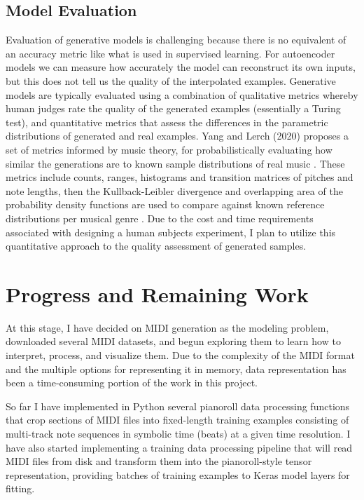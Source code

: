 \documentclass[sigconf,authorversion]{acmart}
\begin{document}
\subsection{Model Evaluation}

Evaluation of generative models is challenging because there is no
equivalent of an accuracy metric like what is used in supervised
learning. For autoencoder models we can measure how accurately the
model can reconstruct its own inputs, but this does not tell us the
quality of the interpolated examples. Generative models are typically
evaluated using a combination of qualitative metrics whereby human
judges rate the quality of the generated examples (essentially a
Turing test), and quantitative metrics that assess the differences in
the parametric distributions of generated and real examples. Yang and
Lerch (2020) proposes a set of metrics informed by music theory, for
probabilistically evaluating how similar the generations are to known
sample distributions of real music \cite{yang_evaluation_2020}. These
metrics include counts, ranges, histograms and transition matrices of
pitches and note lengths, then the Kullback-Leibler divergence and
overlapping area of the probability density functions are used to
compare against known reference distributions per musical genre
\cite{yang_evaluation_2020}. Due to the cost and time requirements
associated with designing a human subjects experiment, I plan to
utilize this quantitative approach to the quality assessment of
generated samples.

\section{Progress and Remaining Work}

At this stage, I have decided on MIDI generation as the modeling
problem, downloaded several MIDI datasets, and begun exploring them to
learn how to interpret, process, and visualize them. Due to the
complexity of the MIDI format and the multiple options for
representing it in memory, data representation has been a
time-consuming portion of the work in this project.

So far I have implemented in Python several pianoroll data processing
functions that crop sections of MIDI files into fixed-length training
examples consisting of multi-track note sequences in symbolic time
(beats) at a given time resolution. I have also started implementing a
training data processing pipeline that will read MIDI files from disk
and transform them into the pianoroll-style tensor representation,
providing batches of training examples to Keras model layers for
fitting.
\end{document}
